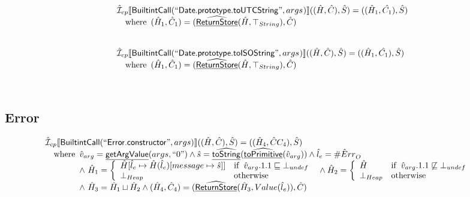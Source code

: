 \documentclass{article}
\newcommand{\SF}[1]{\mbox{\textsf{#1}}}
\newcommand{\wherec}[1]{{\rm where}\begin{array}[t]{l}#1\end{array}}
\newcommand{\ifc}[1]{{\rm if}\begin{array}[t]{l}#1\end{array}}
\newcommand{\owc}{{\rm otherwise}}
\newcommand{\aI}{\hat{\mathcal{I}}}
\newcommand{\lbr}{\llbracket}
\newcommand{\rbr}{\rrbracket}
\newcommand{\hf}[1]{\underline{\sf #1}}
\newcommand{\ahf}[1]{\widehat{\underline{\sf #1}}}
\newcommand{\avarloc}[1]{\hat{\##1}}
\begin{document}
\[\begin{array}{l}
\aI _{cp}\lbr \SF{BuiltintCall}(``\SF{Date.prototype.toUTCString}",args_{})\rbr((\hat{H},\hat{C}), \hat{S})
  = ((\hat{H}_1, \hat{C_1}), \hat{S})\\
\quad\wherec{
  (\hat{H}_1, \hat{C}_1) = (\ahf{ReturnStore}(\hat{H},\top_{String}), \hat{C})\\
  }\\
\\\\


\aI _{cp}\lbr \SF{BuiltintCall}(``\SF{Date.prototype.toISOString}",args_{})\rbr((\hat{H},\hat{C}), \hat{S})
  = ((\hat{H}_1, \hat{C_1}), \hat{S})\\
\quad\wherec{
  (\hat{H}_1, \hat{C}_1) = (\ahf{ReturnStore}(\hat{H},\top_{String}), \hat{C})\\
  }\\
\\\\
\end{array}
\]



\subsection{Error}
\[
\begin{array}{l}
\aI _{cp}\lbr \SF{BuiltintCall}(``\SF{Error.constructor}",args)\rbr((\hat{H},\hat{C}), \hat{S})
  = ((\hat{H}_4, \hat{C}C_4), \hat{S})\\
\quad\wherec{
  \hat{v}_{arg} = \hf{getArgValue}(args, ``0")
  \land \hat{s}= \ahf{toString}(\ahf{toPrimitive}(\hat{v}_{arg}))
  \land \hat{l}_e = \avarloc{Err}_O\\
  \land\ \hat{H}_1 = \left\{\begin{array}{ll}
      \hat{H}[\hat{l}_e \mapsto \hat{H}(\hat{l}_e)[message \mapsto \hat{s}]]
      & \ifc{\hat{v}_{arg}.1.1 \sqsubseteq \bot_{undef}}\\
      \bot_{Heap} & \owc
    \end{array}\right.
  \land \hat{H}_2 = \left\{\begin{array}{ll}
      \hat{H}
      & \ifc{\hat{v}_{arg}.1.1 \not\sqsubseteq \bot_{undef}}\\
      \bot_{Heap} & \owc
    \end{array}\right.\\
  \land\ \hat{H}_3 = \hat{H}_1 \sqcup \hat{H}_2
  \land (\hat{H}_4, \hat{C}_4) = (\ahf{ReturnStore}(\hat{H}_3, Value(\hat{l}_e)), \hat{C})\\
  }\\
\end{array}
\]
\end{document}
